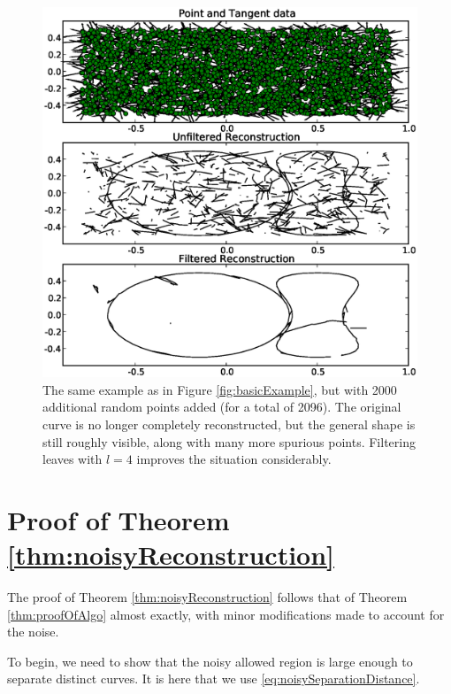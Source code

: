 \documentclass{article}
\numberwithin{cntr}{section}
\numberwithin{equation}{section}
\begin{document}
\begin{figure}
\setlength{\unitlength}{0.240900pt}
\ifx\plotpoint\undefined\newsavebox{\plotpoint}\fi
\sbox{\plotpoint}{\rule[-0.200pt]{0.400pt}{0.400pt}}%
\includegraphics[scale=0.5]{more_noisy_example.eps}

\caption{The same example as in Figure \ref{fig:basicExample}, but with 2000 additional random points added (for a total of 2096). The original curve is no longer completely reconstructed, but the general shape is still roughly visible, along with many more spurious points. Filtering leaves with $l=4$ improves the situation considerably.}
\label{fig:moreNoisyExample}
\end{figure}

\appendix

\section{Proof of Theorem \ref{thm:noisyReconstruction}}
\label{sec:proofOfNoisyReconstruction}
The proof of Theorem \ref{thm:noisyReconstruction} follows that of Theorem \ref{thm:proofOfAlgo} almost exactly, with minor modifications made to account for the noise.

To begin, we need to show that the noisy allowed region is large enough to separate distinct curves. It is here that we use \eqref{eq:noisySeparationDistance}.
\end{document}
